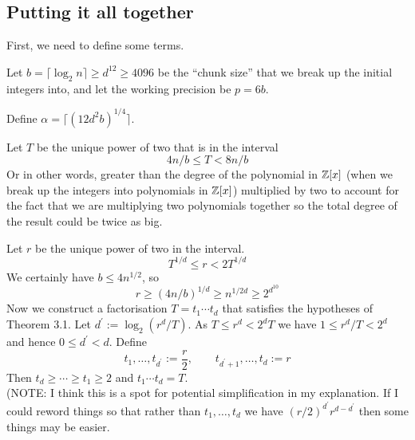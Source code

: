 \subsection{Putting it all together}%
\label{sub:Putting it all together}

First, we need to define some terms.

Let $b = \lceil \log_2 n\rceil \geq d^{12} \geq 4096$ be the ``chunk size'' that we break up the initial integers into, and let the working precision be $p = 6b$.

Define $\alpha = \lceil (12d^2 b)^{1/4}\rceil$.





Let $T$ be the unique power of two that is in the interval
\begin{equation}
    4n/b \leq T < 8n/b
\end{equation}
Or in other words, greater than the degree of the polynomial in ${\mathbb Z}[x]$ (when we break up the integers into polynomials in ${\mathbb Z}[x]$) multiplied by two to account for the fact that we are multiplying two polynomials together so the total degree of the result could be twice as big.

Let $r$ be the unique power of two in the interval.
\[
    T^{1/d} \leq r < 2T^{1/d}
\]
We certainly have $b \leq 4n^{1/2}$, so
\[
    r \geq (4n/b)^{1/d} \geq n^{1/2d} \geq 2^{d^{10}}
\]
Now we construct a factorisation $T = t_1 \cdots t_d$ that satisfies the hypotheses of Theorem 3.1. Let $d^\prime := \log_2(r^d / T)$. As $T \leq r^d < 2^d T$ we have $1 \leq r^d / T < 2^d$ and hence $0 \leq d^\prime < d$. Define
\[
    t_1, \ldots, t_{d^\prime} := \frac{r}{2}, \qquad t_{d^\prime + 1} , \ldots, t_d := r
\]
Then $t_d \geq \cdots \geq t_1 \geq 2$ and $t_1\cdots t_d = T$.\\
(NOTE: I think this is a spot for potential simplification in my explanation. If I could reword things so that rather than $t_1, \ldots, t_d$ we have $(r/2)^{d^\prime} r^{d-d^\prime}$ then some things may be easier.

